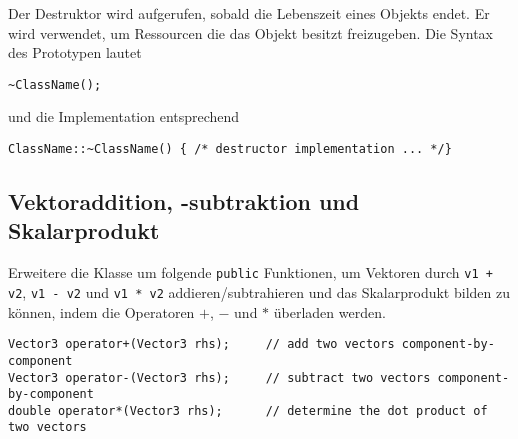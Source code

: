Der Destruktor wird aufgerufen, sobald die Lebenszeit eines Objekts endet. Er wird verwendet, um Ressourcen die das Objekt besitzt freizugeben.
Die Syntax des Prototypen lautet

\begin{lstlisting}
~ClassName();
\end{lstlisting}

und die Implementation entsprechend

\begin{lstlisting}
ClassName::~ClassName() { /* destructor implementation ... */}
\end{lstlisting}


\subsection{Vektoraddition, -subtraktion und Skalarprodukt}
Erweitere die Klasse um folgende \lstinline{public} Funktionen, um Vektoren durch \lstinline{v1 + v2}, \lstinline{v1 - v2} und \lstinline{v1 * v2} addieren/subtrahieren und das Skalarprodukt bilden zu können, indem die Operatoren $+$, $-$ und $*$ überladen werden.

\begin{lstlisting}
Vector3 operator+(Vector3 rhs);		// add two vectors component-by-component
Vector3 operator-(Vector3 rhs);		// subtract two vectors component-by-component
double operator*(Vector3 rhs);		// determine the dot product of two vectors
\end{lstlisting}

